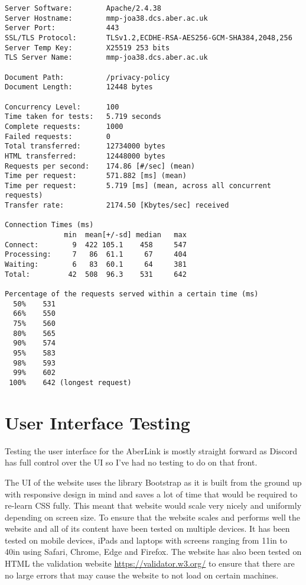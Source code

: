 \begin{verbatim}
Server Software:        Apache/2.4.38
Server Hostname:        mmp-joa38.dcs.aber.ac.uk
Server Port:            443
SSL/TLS Protocol:       TLSv1.2,ECDHE-RSA-AES256-GCM-SHA384,2048,256
Server Temp Key:        X25519 253 bits
TLS Server Name:        mmp-joa38.dcs.aber.ac.uk

Document Path:          /privacy-policy
Document Length:        12448 bytes

Concurrency Level:      100
Time taken for tests:   5.719 seconds
Complete requests:      1000
Failed requests:        0
Total transferred:      12734000 bytes
HTML transferred:       12448000 bytes
Requests per second:    174.86 [#/sec] (mean)
Time per request:       571.882 [ms] (mean)
Time per request:       5.719 [ms] (mean, across all concurrent requests)
Transfer rate:          2174.50 [Kbytes/sec] received

Connection Times (ms)
              min  mean[+/-sd] median   max
Connect:        9  422 105.1    458     547
Processing:     7   86  61.1     67     404
Waiting:        6   83  60.1     64     381
Total:         42  508  96.3    531     642

Percentage of the requests served within a certain time (ms)
  50%    531
  66%    550
  75%    560
  80%    565
  90%    574
  95%    583
  98%    593
  99%    602
 100%    642 (longest request)
\end{verbatim}

\section{User Interface Testing}
Testing the user interface for the AberLink is mostly straight forward as Discord has full control over the UI so I've had no testing to do on that front.

The UI of the website uses the library Bootstrap \cite{bootstrap} as it is built from the ground up with responsive design in mind and saves a lot of time that would be required to re-learn CSS fully. This meant that website would scale very nicely and uniformly depending on screen size. To ensure that the website scales and performs well the website and all of its content have been tested on multiple devices. It has been tested on mobile devices, iPads and laptops with screens ranging from 11in to 40in using Safari, Chrome, Edge and Firefox. The website has also been tested on HTML the validation website \href{https://validator.w3.org/}{https://validator.w3.org/} to ensure that there are no large errors that may cause the website to not load on certain machines.

